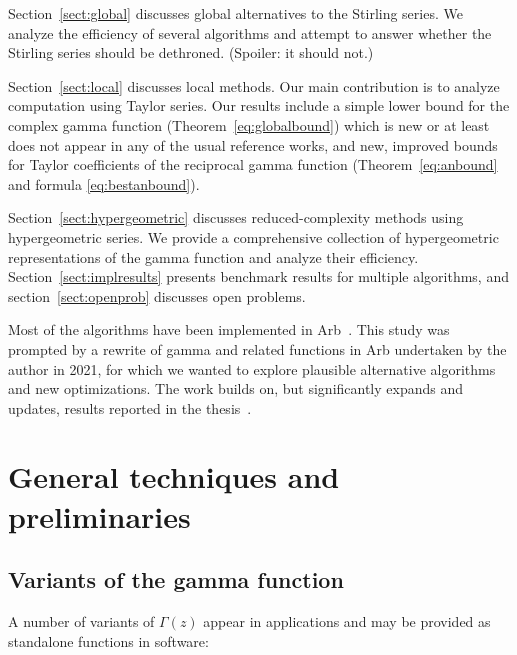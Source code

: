 \documentclass[reqno]{amsart}
\theoremstyle{definition}
\begin{document}
Section~\ref{sect:global} discusses global alternatives to the
Stirling series. We analyze the efficiency of several algorithms
and attempt to answer whether the Stirling series should be dethroned. (Spoiler: it should not.)

Section~\ref{sect:local} discusses local methods.
Our main contribution is to analyze
computation using Taylor series. Our results include
a simple lower bound for the complex gamma function (Theorem~\ref{eq:globalbound})
which is new or at least does not appear in any of the usual reference works,
and new, improved bounds for Taylor coefficients
of the reciprocal gamma function (Theorem~\ref{eq:anbound} and formula \ref{eq:bestanbound}).

Section~\ref{sect:hypergeometric} discusses reduced-complexity
methods using hypergeometric series. We provide a comprehensive
collection of hypergeometric representations
of the gamma function and analyze their efficiency.
Section~\ref{sect:implresults} presents benchmark results
for multiple algorithms, and section~\ref{sect:openprob} discusses open problems.

Most of the algorithms
have been implemented in Arb~\cite{Joh2017}.
This study was prompted by a rewrite
of gamma and related functions in Arb undertaken by the author in 2021,
for which we wanted to explore plausible alternative algorithms
and new optimizations.
The work builds on, but significantly expands and updates, results reported in the thesis~\cite{Johansson2014thesis}.

\section{General techniques and preliminaries}

\label{sect:general}


\subsection{Variants of the gamma function}

A number of variants of $\Gamma(z)$ appear in applications
and may be provided as standalone functions in software:
\end{document}
